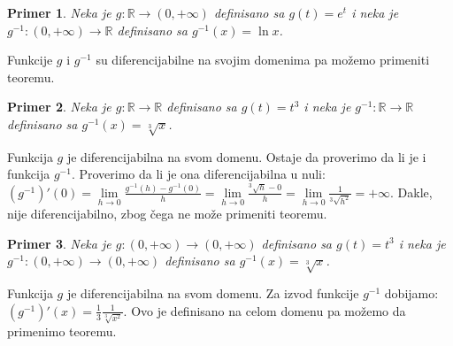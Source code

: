 \documentclass{article}
\newtheorem{prim}{Primer}[section]
\begin{document}
\begin{primbox}
    \begin{prim}
        Neka je $g: \mathbb{R} \longrightarrow (0, +\infty)$ definisano sa
        $g(t) = e^t$ i neka je $g^{-1}:(0, +\infty)\longrightarrow \mathbb{R}$
        definisano sa $g^{-1}(x) = \ln{x}$.
    \end{prim}
    Funkcije $g$ i $g^{-1}$
    su diferencijabilne na svojim domenima pa možemo primeniti teoremu.
\end{primbox}
\begin{primbox}
    \begin{prim}
        Neka je $g:\mathbb{R}\longrightarrow\mathbb{R}$
        definisano sa $g(t) = t^3$ i neka je $g^{-1}:\mathbb{R}\longrightarrow\mathbb{R}$
        definisano sa $g^{-1}(x) = \sqrt[3]{x}$.
    \end{prim}
    Funkcija $g$ je diferencijabilna
    na svom domenu. Ostaje da proverimo da li je i funkcija $g^{-1}$. Proverimo da li je ona diferencijabilna u nuli:
    $(g^{-1})'(0) = \lim\limits_{h\rightarrow 0}\frac{g^{-1}(h) - g^{-1}(0)}{h} = \lim\limits_{h\rightarrow 0}\frac{^3\sqrt{h} - 0}{h} = \lim\limits_{h\rightarrow 0}\frac{1}{^3\sqrt{h^2}} = +\infty$.
    Dakle, nije diferencijabilno, zbog čega ne može primeniti teoremu.\par
\end{primbox}
\begin{primbox}
    \begin{prim}
        Neka je $g: (0, +\infty) \longrightarrow (0, +\infty)$
        definisano sa $ g(t) = t^3$ i neka je $g^{-1}: (0,+\infty)\longrightarrow(0,+\infty)$
        definisano sa $ g^{-1}(x) = \sqrt[3]{x}$.
    \end{prim}
    Funkcija $g$ je diferencijabilna na svom domenu.
    Za izvod funkcije $g^{-1}$ dobijamo: $(g^{-1})'(x) = \frac{1}{3}\frac{1}{\sqrt[3]{x^2}}$.
    Ovo je definisano na celom domenu pa možemo da primenimo teoremu.\par
\end{primbox}
\end{document}
